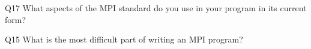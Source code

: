 \begin{description}%
\item{Q17} What aspects of the MPI standard do you use in your program in its current form?%
\item{Q15} What is the most difficult part of writing an MPI program?%
\end{description}%
